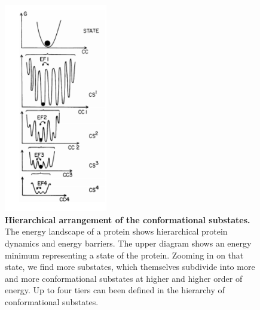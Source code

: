 \begin{figure} %
    \centering
    \includegraphics[width=0.4\textwidth]{energy_landscape}
    \caption{\textbf{Hierarchical arrangement of the conformational substates.} The energy landscape of a protein shows hierarchical protein dynamics and energy barriers. The upper diagram shows an energy minimum representing a state of the protein. Zooming in on that state, we find more substates, which themselves subdivide into more and more conformational substates at higher and higher order of energy. Up to four tiers can been defined in the hierarchy of conformational substates.}
    \label{fig:energy_landscape}
\end{figure}

